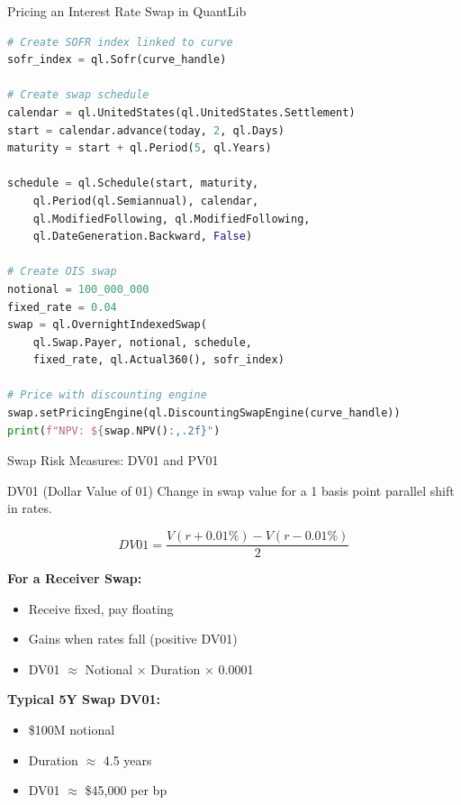 \documentclass[aspectratio=169,11pt]{beamer}
\begin{document}
\begin{frame}[fragile]{Pricing an Interest Rate Swap in QuantLib}
\begin{lstlisting}[language=Python]
# Create SOFR index linked to curve
sofr_index = ql.Sofr(curve_handle)

# Create swap schedule
calendar = ql.UnitedStates(ql.UnitedStates.Settlement)
start = calendar.advance(today, 2, ql.Days)
maturity = start + ql.Period(5, ql.Years)

schedule = ql.Schedule(start, maturity,
    ql.Period(ql.Semiannual), calendar,
    ql.ModifiedFollowing, ql.ModifiedFollowing,
    ql.DateGeneration.Backward, False)

# Create OIS swap
notional = 100_000_000
fixed_rate = 0.04
swap = ql.OvernightIndexedSwap(
    ql.Swap.Payer, notional, schedule,
    fixed_rate, ql.Actual360(), sofr_index)

# Price with discounting engine
swap.setPricingEngine(ql.DiscountingSwapEngine(curve_handle))
print(f"NPV: ${swap.NPV():,.2f}")
\end{lstlisting}
\end{frame}

\begin{frame}{Swap Risk Measures: DV01 and PV01}
\begin{block}{DV01 (Dollar Value of 01)}
Change in swap value for a 1 basis point parallel shift in rates.
\end{block}

\[
DV01 = \frac{V(r+0.01\%) - V(r-0.01\%)}{2}
\]

\textbf{For a Receiver Swap:}
\begin{itemize}
    \item Receive fixed, pay floating
    \item Gains when rates fall (positive DV01)
    \item DV01 $\approx$ Notional $\times$ Duration $\times$ 0.0001
\end{itemize}

\textbf{Typical 5Y Swap DV01:}
\begin{itemize}
    \item \$100M notional
    \item Duration $\approx$ 4.5 years
    \item DV01 $\approx$ \$45,000 per bp
\end{itemize}
\end{frame}
\end{document}
